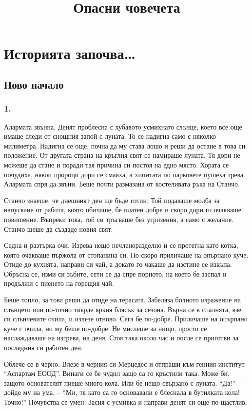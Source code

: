 \documentclass[ebook,openany,12pt]{memoir}
\title{Опасни човечета}
\date{}
\author{}
\begin{document}
\clearpage\maketitle
\thispagestyle{empty}

\part{Историята започва\ldots}

\chapter{Ново начало}

\section*{1.}


Алармата звънна. Денят проблесна с хубавото усмихнато слънце, което все още имаше следи от снощния запой с луната. То се надигна само с няколко милиметра. Надигна се още, почна да му става лошо и реши да остане в това си положение. От другата страна на кръглия свят се намираше луната. Тя дори не можеше да стане и поради тая причина си постоя на едно място. Хората се почудиха, някои пророци дори се смаяха, а хипитата по парковете пушеха трева. Алармата спря да звъни. Беше почти размазана от костеливата ръка на Станчо. 

Станчо знаеше, че днешният ден ще бъде готин. Той подаваше молба за напускане от работа, която обичаше, бе платен добре и скоро дори го очакваше повишение. Въпреки това, той си тръгваше без угризения, а само с желание. Станчо щеше да създаде новия свят.

Седна и разтърка очи. Изрева нещо нечленоразделно и се протегна като котка, която очакваше пържола от стопанина си. По-скоро приличаше на опърпано куче. Отиде до кухнята, направи си чай, а докато го чакаше да изстине се изкъпа. Обръсна се, изми си зъбите, сети се да спре порното, на което бе заспал и продължи с пиенето на горещия чай.

Беше топло, за това реши да отиде на терасата. Забеляза болното изражение на слънцето или по-точно твърде яркия блясък за сезона. Върна се в спалнята, взе си слънчевите очила, и излезе отново. Сега бе по-добре. Приличаше на опърпано куче с очила, но му беше по-добре. Не мислеше за нищо, просто се наслаждаваше на изгрева, на деня. Стоя така около час и после се приготви за последния си работен ден.

Облече се в черно. Влезе в черния си Мерцедес и отпраши към генния институт ``Аспартам ЕООД''. Винаги се бе чудил защо са го кръстили така. Може би, защото основателят пиеше много кола. Или бе нещо свързано с луната. ``Да!'' – дойде му на ума. – ``Ми, тя като са го основавали е блеснала в бутилката кола! Точно!'' Почувства се умен. Засия с усмивка и направи денят си още по-щастлив.
\end{document}
